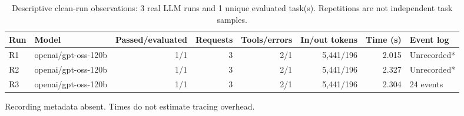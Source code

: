 \begin{table}[t]
\centering
\small
\caption{Descriptive clean-run observations: 3 real LLM runs and 1 unique evaluated task(s). Repetitions are not independent task samples.}
\begin{tabular}{llrrrrrl}
\toprule
Run & Model & Passed/evaluated & Requests & Tools/errors & In/out tokens & Time (s) & Event log \\
\midrule
R1 & openai/gpt-oss-120b & 1/1 & 3 & 2/1 & 5,441/196 & 2.015 & Unrecorded* \\
R2 & openai/gpt-oss-120b & 1/1 & 3 & 2/1 & 5,441/196 & 2.327 & Unrecorded* \\
R3 & openai/gpt-oss-120b & 1/1 & 3 & 2/1 & 5,441/196 & 2.304 & 24 events \\
\bottomrule
\end{tabular}
\par\footnotesize * Recording metadata absent. Times do not estimate tracing overhead.
\end{table}
